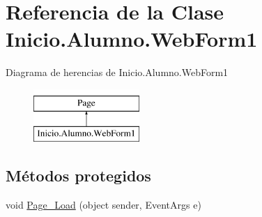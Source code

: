 \hypertarget{classInicio_1_1Alumno_1_1WebForm1}{}\section{Referencia de la Clase Inicio.\+Alumno.\+Web\+Form1}
\label{classInicio_1_1Alumno_1_1WebForm1}
Diagrama de herencias de Inicio.\+Alumno.\+Web\+Form1\begin{figure}[H]
\begin{center}
\leavevmode
\includegraphics[height=2.000000cm]{classInicio_1_1Alumno_1_1WebForm1}
\end{center}
\end{figure}
\subsection*{Métodos protegidos}
\begin{DoxyCompactItemize}
\item 
void \mbox{\hyperlink{classInicio_1_1Alumno_1_1WebForm1_aacd2912ae3abebf6ba973a8596d4cc6f}{Page\+\_\+\+Load}} (object sender, Event\+Args e)
\end{DoxyCompactItemize}
